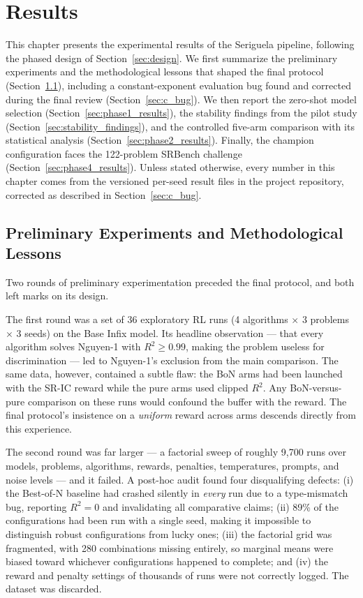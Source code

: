 \chapter{Results}
\label{ch:results}

This chapter presents the experimental results of the Seriguela pipeline, following the phased design of Section~\ref{sec:design}. We first summarize the preliminary experiments and the methodological lessons that shaped the final protocol (Section~\ref{sec:prephase}), including a constant-exponent evaluation bug found and corrected during the final review (Section~\ref{sec:c_bug}). We then report the zero-shot model selection (Section~\ref{sec:phase1_results}), the stability findings from the pilot study (Section~\ref{sec:stability_findings}), and the controlled five-arm comparison with its statistical analysis (Section~\ref{sec:phase2_results}). Finally, the champion configuration faces the 122-problem SRBench challenge (Section~\ref{sec:phase4_results}). Unless stated otherwise, every number in this chapter comes from the versioned per-seed result files in the project repository, corrected as described in Section~\ref{sec:c_bug}.

\section{Preliminary Experiments and Methodological Lessons}
\label{sec:prephase}

Two rounds of preliminary experimentation preceded the final protocol, and both left marks on its design.

The first round was a set of 36 exploratory RL runs (4 algorithms $\times$ 3 problems $\times$ 3 seeds) on the Base Infix model. Its headline observation --- that every algorithm solves Nguyen-1 with $R^2 \geq 0.99$, making the problem useless for discrimination --- led to Nguyen-1's exclusion from the main comparison. The same data, however, contained a subtle flaw: the BoN arms had been launched with the SR-IC reward while the pure arms used clipped $R^2$. Any BoN-versus-pure comparison on these runs would confound the buffer with the reward. The final protocol's insistence on a \emph{uniform} reward across arms descends directly from this experience.

\label{sec:phase_a_lessons}
The second round was far larger --- a factorial sweep of roughly 9{,}700 runs over models, problems, algorithms, rewards, penalties, temperatures, prompts, and noise levels --- and it failed. A post-hoc audit found four disqualifying defects: (i) the Best-of-N baseline had crashed silently in \emph{every} run due to a type-mismatch bug, reporting $R^2 = 0$ and invalidating all comparative claims; (ii) 89\% of the configurations had been run with a single seed, making it impossible to distinguish robust configurations from lucky ones; (iii) the factorial grid was fragmented, with 280 combinations missing entirely, so marginal means were biased toward whichever configurations happened to complete; and (iv) the reward and penalty settings of thousands of runs were not correctly logged. The dataset was discarded.

